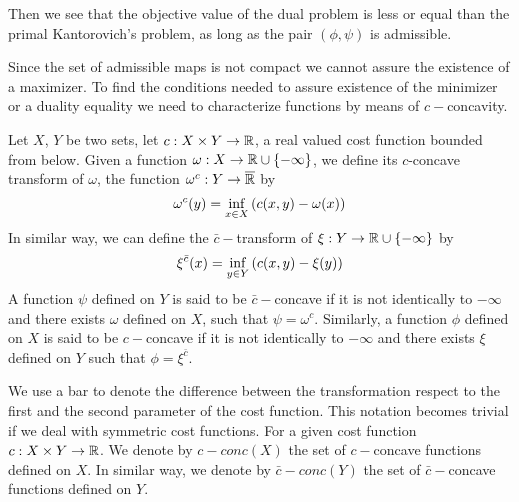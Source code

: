 Then we see that the objective value of the dual problem is less or equal than the primal Kantorovich's problem, as long as the pair $(\phi, \psi)$ is admissible.

Since the set of admissible maps is not compact we cannot assure the existence of a maximizer. To find the conditions needed to assure existence of the minimizer or a duality equality we need to characterize functions by means of $c-$concavity.

\begin{definition}
	Let $X$, $Y$ be two sets, let $c:X\times Y \rightarrow \mathbb{R}$, a real valued cost function bounded from below. Given a function $\omega: X\rightarrow \mathbb{R}\cup\left\lbrace -\infty \right\rbrace$, we define its $c$-concave transform of $\omega$, the function $\omega^c: Y\rightarrow \overline{\mathbb{R}}$ by
	\begin{equation}
	\omega^c(y)=\inf_{x\in X}\left( c(x,y)-\omega(x) \right)
	\end{equation}
	In similar way, we can define the $\bar{c}-$transform of $\xi: Y\rightarrow \mathbb{R}\cup\left\lbrace -\infty \right\rbrace$ by
	\begin{equation}
	\xi^{\bar{c}}(x)=\inf_{y\in Y}\left( c(x, y)-\xi(y) \right)
	\end{equation}
	A function $\psi$ defined on $Y$ is said to be $\bar c-$concave if it is not identically to $-\infty$ and there exists $\omega$ defined on $X$, such that $\psi=\omega^c$. Similarly, a function $\phi$ defined on $X$ is said to be $ c-$concave if it is not identically to $-\infty$ and there exists $\xi$ defined on $Y$ such that $\phi=\xi^{\bar{c}}$.
\end{definition}

We use a bar to denote the difference between the transformation respect to the first and the second parameter of the cost function. This notation becomes trivial if we deal with symmetric cost functions.
For a given cost function $c:X\times Y\rightarrow \mathbb{R}$. We denote by $c-conc(X)$ the set of $c-$concave  functions defined on $X$. In similar way, we denote by $\bar{c}-conc(Y)$ the set of $\bar{c}-$concave functions defined on $Y$. 


